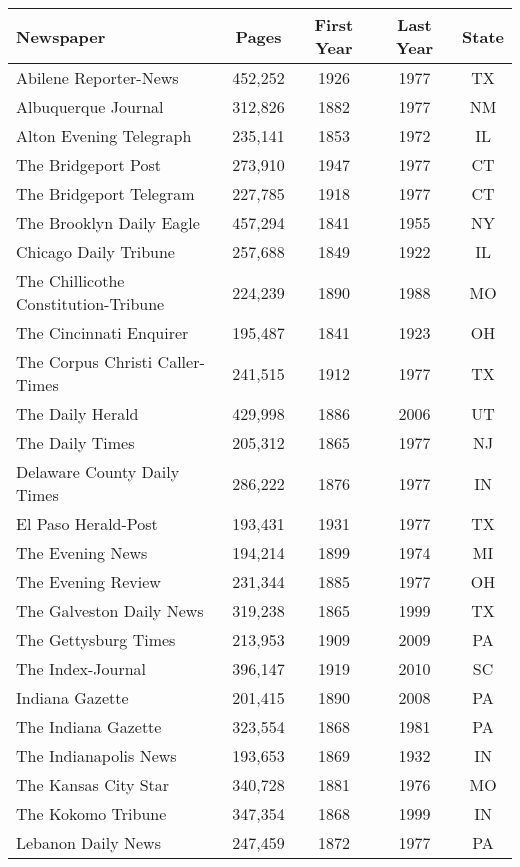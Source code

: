 \documentclass[11pt]{article}
\begin{document}
\begin{table}[t]
\centering
\footnotesize
\begin{tabular}{lcccc}
\toprule \toprule
Newspaper & Pages & First Year & Last Year & State \\ \midrule
Abilene Reporter-News &  452,252 & 1926 & 1977 & TX\\
Albuquerque Journal &  312,826 & 1882 & 1977 & NM\\
Alton Evening Telegraph &  235,141 & 1853 & 1972 & IL\\
The Bridgeport Post &  273,910 & 1947 & 1977 & CT\\
The Bridgeport Telegram &  227,785 & 1918 & 1977 & CT\\
The Brooklyn Daily Eagle &  457,294 & 1841 & 1955 & NY\\
Chicago Daily Tribune &  257,688 & 1849 & 1922 & IL\\
The Chillicothe Constitution-Tribune &  224,239 & 1890 & 1988 & MO\\
The Cincinnati Enquirer &  195,487 & 1841 & 1923 & OH\\
The Corpus Christi Caller-Times &  241,515 & 1912 & 1977 & TX\\
The Daily Herald &  429,998 & 1886 & 2006 & UT\\
The Daily Times &  205,312 & 1865 & 1977 & NJ\\
Delaware County Daily Times &  286,222 & 1876 & 1977 & IN\\
El Paso Herald-Post &  193,431 & 1931 & 1977 & TX\\
The Evening News &  194,214 & 1899 & 1974 & MI\\
The Evening Review &  231,344 & 1885 & 1977 & OH\\
The Galveston Daily News &  319,238 & 1865 & 1999 & TX\\
The Gettysburg Times &  213,953 & 1909 & 2009 & PA\\
The Index-Journal &  396,147 & 1919 & 2010 & SC\\
Indiana Gazette &  201,415 & 1890 & 2008 & PA\\
The Indiana Gazette &  323,554 & 1868 & 1981 & PA\\
The Indianapolis News &  193,653 & 1869 & 1932 & IN\\
The Kansas City Star &  340,728 & 1881 & 1976 & MO\\
The Kokomo Tribune &  347,354 & 1868 & 1999 & IN\\
Lebanon Daily News &  247,459 & 1872 & 1977 & PA\\

\end{tabular}
\end{table}
\end{document}
